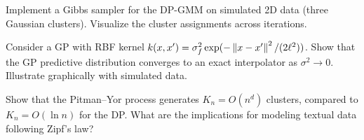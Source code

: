 \begin{exercise}
Implement a Gibbs sampler for the DP-GMM on simulated 2D data (three
Gaussian clusters). Visualize the cluster assignments across iterations.
\end{exercise}

\begin{exercise}
Consider a GP with RBF kernel $k(x,x') = \sigma_f^2 \exp(-\left\| x-x' \right\|^2/(2\ell^2))$.
Show that the GP predictive distribution converges to an exact interpolator
as $\sigma^2 \to 0$. Illustrate graphically with simulated data.
\end{exercise}

\begin{exercise}
Show that the Pitman--Yor process generates $K_n = O(n^d)$ clusters,
compared to $K_n = O(\ln n)$ for the DP. What are the implications for
modeling textual data following Zipf's law?
\end{exercise}
